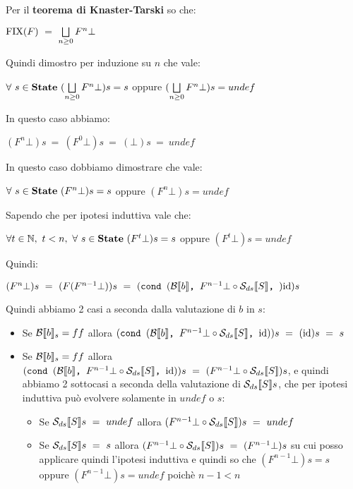 {    Per il \textbf{teorema di Knaster-Tarski} so che:
    \begin{center}
    $\textrm{\normalfont{FIX}}(F)~=~\bigsqcup\limits_{n\geq{}0}F^{n}\bot$
    \end{center}
    Quindi dimostro per induzione su $n$ che vale:
    \begin{center}
    $\forall~s\in\mbox{\textbf{State}}~(\bigsqcup\limits_{n\geq{}0}F^{n}\bot)s=s$ oppure 
    $(\bigsqcup\limits_{n\geq{}0}F^{n}\bot)s=undef$
    \end{center}
     In questo caso abbiamo:
    \begin{center}
    $(F^{n}\bot)s~=~(F^{0}\bot)s~=~(\bot)s~=~undef$
    \end{center}
     In questo caso dobbiamo dimostrare che vale:
    \begin{center}
    $\forall~s\in\mbox{\textbf{State}}~(F^{n}\bot)s=s$ oppure $(F^{n}\bot)s=undef$
    \end{center}
    Sapendo che per ipotesi induttiva vale che:
    \begin{center}
    $\forall t\in\mathbb{N},~t<n,~\forall~s\in\mbox{\textbf{State}}~(F^{t}\bot)s=s$ oppure
    $(F^{t}\bot)s=undef$
    \end{center}
    Quindi:
    \begin{center}
    $(F^{n}\bot)s~=~(F(F^{n-1}\bot))s~=~(\cond{b}{F^{n-1}\bot \circ \Sds}
    {\idDS})s$
    \end{center}
    Quindi abbiamo 2 casi a seconda dalla valutazione di $b$ in $s$:
    \begin{itemize}
    \item Se $\mathcal{B}{}\llbracket b \rrbracket_s=ff$ allora $(\mbox{\normalfont{\texttt{cond }}} (\mathcal{B}{}\llbracket b \rrbracket \textrm{\normalfont{\texttt{, }}} F^{n-1}\bot \circ \mathcal{S}_{ds}\llbracket S \rrbracket \textrm{\normalfont{\texttt{, }}} \textrm{\normalfont{id}}))s~=~(\textrm{\normalfont{id}})s~=~s$

    \item Se $\mathcal{B}{}\llbracket b \rrbracket_s=ff$ allora $(\mbox{\normalfont{\texttt{cond }}} (\mathcal{B}{}\llbracket b \rrbracket \textrm{\normalfont{\texttt{, }}} F^{n-1}\bot \circ \mathcal{S}_{ds}\llbracket S \rrbracket \textrm{\normalfont{\texttt{, }}} \textrm{\normalfont{id}}))s~=~(F^{n-1}\bot \circ \mathcal{S}_{ds}\llbracket S \rrbracket)s$, e quindi abbiamo 2 sottocasi a
    seconda della valutazione di $\mathcal{S}_{ds}\llbracket S \rrbracket{}s$, che per ipotesi induttiva può
    evolvere solamente in $undef$ o $s$:
        \begin{itemize}
        \item Se $\mathcal{S}_{ds}\llbracket S \rrbracket{}s~=~undef$ allora $(F^{n-1}\bot \circ \mathcal{S}_{ds}\llbracket S \rrbracket)s~=~undef$

        \item Se $\mathcal{S}_{ds}\llbracket S \rrbracket{}s~=~s$ allora $(F^{n-1}\bot \circ \mathcal{S}_{ds}\llbracket S \rrbracket)s~=~
        (F^{n-1}\bot)s$ su cui posso applicare quindi l'ipotesi induttiva e
        quindi so che $(F^{n-1}\bot)s=s$ oppure $(F^{n-1}\bot)s=undef$ poichè
        $n-1<n$
        \end{itemize}
    \end{itemize}
}
\newpage
